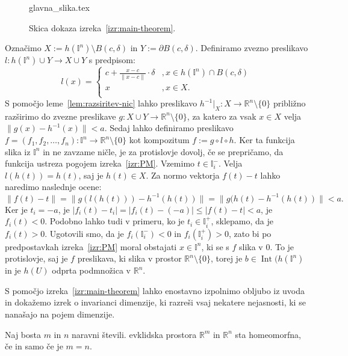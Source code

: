 \documentclass[mat1]{fmfdelo}
\newcommand{\R}{\mathbb R}
\DeclareMathOperator{\Int}{Int}
\newcommand{\I}{\mathbb I}
\newcommand{\0}{0}
\begin{document}
\begin{dokaz}
\begin{figure}[h!]
	\centering
	{glavna_slika.tex}%
	\caption{Skica dokaza izreka~\ref{izr:main-theorem}.}
\end{figure}
Označimo $X := h(\I^n) \setminus B(c, \delta)$ in $Y := \partial B(c, \delta)$. Definiramo zvezno preslikavo $l : h(\I^n) \cup Y \to X \cup Y$ s predpisom:
\[  l(x) = \left\{
\begin{array}{ll}
	c + \frac{x - c}{\| x - c \|} \cdot \delta &, x \in h(\I^n) \cap B(c, \delta) \\
	x &, x \in X. \\
\end{array} 
\right. \]
S pomočjo leme~\ref{lem:razsiritev-nic} lahko preslikavo $h^{-1}|_X : X \to \R^n \setminus \{ \0 \}$ približno razširimo do zvezne preslikave $g : X \cup Y \to \R^n \setminus \{ \0 \}$, za katero za vsak $x \in X$ velja $\| g(x) - h^{-1}(x) \| < a$.
Sedaj lahko definiramo preslikavo $f = (f_1, f_2, \dots, f_n) : \I^n \to \R^n \setminus \{ \0 \}$ kot kompozitum $f := g \circ l \circ h$. Ker ta funkcija slika iz $\I^n$ in ne zavzame ničle, je za protislovje dovolj, če se prepričamo, da funkcija ustreza pogojem izreka~\ref{izr:PM}. Vzemimo $t \in \I_i^-$. Velja $l(h(t)) = h(t)$, saj je $h(t) \in X$. Za normo vektorja $f(t) - t$ lahko naredimo naslednje ocene:
$$\| f(t) - t \| = \| g(l(h(t))) - h^{-1}(h(t)) \| = \| g(h(t) - h^{-1}(h(t)) \| < a.$$ 
Ker je $t_i = - a$, je $| f_i (t) - t_i | = | f_i (t) - ( - a) | \leq | f (t) - t | < a$, je $f_i(t) < 0$. Podobno lahko tudi v primeru, ko je $t_i \in \I_i^+$, sklepamo, da je $f_i(t) > 0$. Ugotovili smo, da je  $f_i(\I_i^-) < 0$ in $f_i(\I_i^+) > 0$, zato bi po predpostavkah izreka~\ref{izr:PM} moral obstajati $x \in \I^n$, ki se s $f$ slika v $0$. To je protislovje, saj je $f$ preslikava, ki slika v prostor $\R^n \setminus \{ \0 \}$, torej je $b \in \Int (h(\I^n)$ in je $h(U)$ odprta podmnožica v $\R^n$.
\end{dokaz}
S pomočjo izreka~\ref{izr:main-theorem} lahko enostavno izpolnimo obljubo iz uvoda in dokažemo izrek o invarianci dimenzije, ki razreši vsaj nekatere nejasnosti, ki se nanašajo na pojem dimenzije.
\begin{posledica}\label{izr:dim_izr}
Naj bosta $m$ in $n$ naravni števili. evklidska prostora $\R^m$ in $\R^n$ sta homeomorfna, če in samo če je $m = n$.
\end{posledica}
\end{document}
